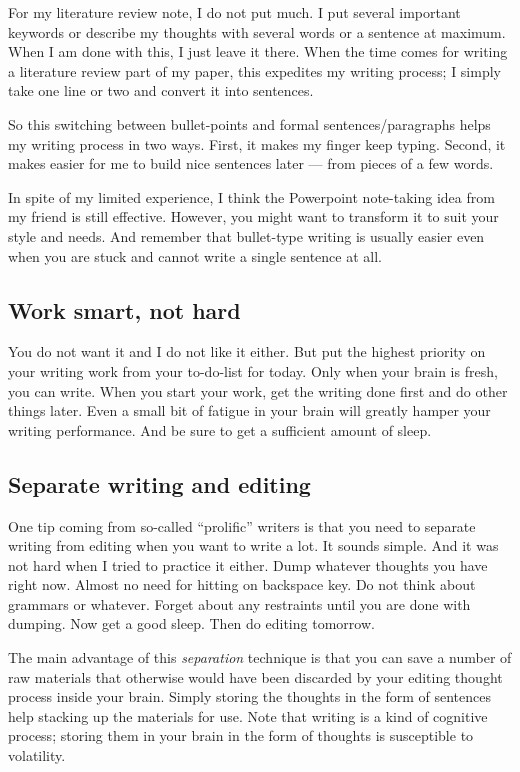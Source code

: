 \documentclass[11pt]{article}
\begin{document}
For my literature review note, I do not put much. I put several important
keywords or describe my thoughts with several words or a sentence at maximum.
When I am done with this, I just leave it there.  When the time comes for 
writing a literature review part of my paper, this expedites my writing
process; I simply take one line or two and convert it into sentences.

So this switching between bullet-points and formal sentences/paragraphs helps
my writing process in two ways. First, it makes my finger keep typing. Second,
it makes easier for me to build nice sentences later --- from pieces of a
few words.

In spite of my limited experience, I think the Powerpoint note-taking idea
from my friend is still effective. However, you might want to transform it to
suit your style and needs. And remember that bullet-type writing is usually
easier even when you are stuck and cannot write a single sentence at all.

\subsection{Work smart, not hard}

You do not want it and I do not like it either. But put the highest priority
on your writing work from your to-do-list for today. Only when your brain is
fresh, you can write. When you start your work, get the writing done first and
do other things later. Even a small bit of fatigue in your brain will greatly
hamper your writing performance. And be sure to get a sufficient amount of
sleep. 

\subsection{Separate writing and editing}

One tip coming from so-called ``prolific'' writers is that you need to
separate writing from editing when you want to write a lot. It sounds simple.
And it was not hard when I tried to practice it either.  Dump whatever
thoughts you have right now.  Almost no need for hitting on backspace key. Do
not think about grammars or whatever. Forget about any restraints until you
are done with dumping. Now get a good sleep. Then do editing tomorrow.

The main advantage of this \emph{separation} technique is that you can save a
number of raw materials that otherwise would have been discarded by your
editing thought process inside your brain. Simply storing the thoughts in the
form of sentences help stacking up the materials for use. Note that writing is
a kind of cognitive process; storing them in your brain in the form of
thoughts is susceptible to volatility.
\end{document}
